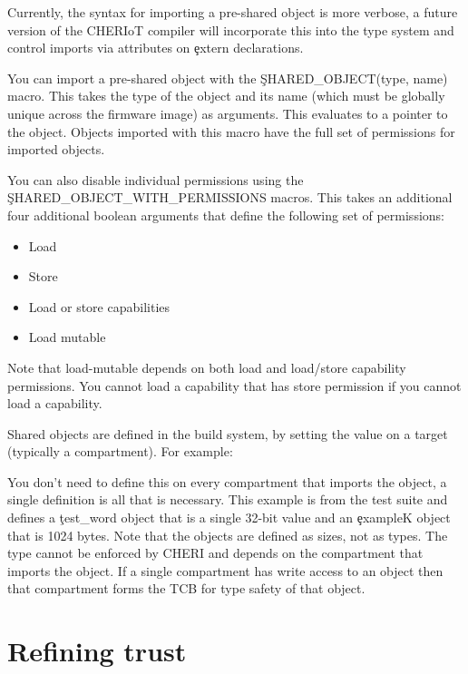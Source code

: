 Currently, the syntax for importing a pre-shared object is more verbose, a future version of the CHERIoT compiler will incorporate this into the type system and control imports via attributes on \c{extern} declarations.

You can import a pre-shared object with the \c{SHARED_OBJECT(type, name)} macro.
This takes the type of the object and its name (which must be globally unique across the firmware image) as arguments.
This evaluates to a pointer to the object.
Objects imported with this macro have the full set of permissions for imported objects.

You can also disable individual permissions using the \c{SHARED_OBJECT_WITH_PERMISSIONS} macros.
This takes an additional four additional boolean arguments that define the following set of permissions:

\begin{itemize}
	\item{Load}
	\item{Store}
	\item{Load or store capabilities}
	\item{Load mutable}
\end{itemize}

Note that load-mutable depends on both load and load/store capability permissions.
You cannot load a capability that has store permission if you cannot load a capability.

Shared objects are defined in the build system, by setting the  value on a target (typically a compartment).
For example:

\begin{luasnippet}
    on_load(function(target)
        target:values_set("shared_objects", { exampleK = 1024, test_word = 4 \}, {expand = false\})
    end)
\end{luasnippet}

You don't need to define this on every compartment that imports the object, a single definition is all that is necessary.
This example is from the test suite and defines a \c{test_word} object that is a single 32-bit value and an \c{exampleK} object that is 1024 bytes.
Note that the objects are defined as sizes, not as types.
The type cannot be enforced by CHERI and depends on the compartment that imports the object.
If a single compartment has write access to an object then that compartment forms the TCB for type safety of that object.

\section{Refining trust}

